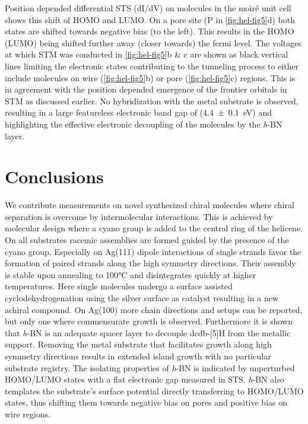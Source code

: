 Position depended differential STS (dI/dV) on molecules in the moir\'e unit cell shows this shift of HOMO and LUMO. On a pore site (P in \autoref{fig:hel-fig5}d) both states are shifted towards negative bias (to the left). This results in the HOMO (LUMO) being shifted further away (closer towards) the fermi level. The voltages at which STM was conducted in \autoref{fig:hel-fig5}b \& c are shown as black vertical lines limiting the electronic states contributing to the tunneling process to either include molecules on wire (\autoref{fig:hel-fig5}b) or pore (\autoref{fig:hel-fig5}c) regions. This is in agreement with the position depended emergence of the frontier orbitals in STM as discussed earlier. No hybridization with the metal substrate is observed, resulting in a large featureless electronic band gap of (\SI{4.4 \pm 0.1}{\eV}) and highlighting the effective electronic decoupling of the molecules by the \textit{h}-BN layer.


\section{Conclusions}

We contribute measurements on novel synthesized chiral molecules where chiral separation is overcome by intermolecular interactions. This is achieved by molecular design where a cyano group is added to the central ring of the helicene. On all substrates racemic assemblies are formed guided by the presence of the cyano group. Especially on Ag(111) dipole interactions of single strands favor the formation of paired strands along the high symmetry directions. Their assembly is stable upon annealing to 100°C and disintegrates quickly at higher temperatures. Here single molecules undergo a surface assisted cyclodehydrogenation using the silver surface as catalyst resulting in a new achiral compound. On Ag(100) more chain directions and setups can be reported, but only one where commensurate growth is observed. Furthermore it is shown that \textit{h}-BN is an adequate spacer layer to decouple dcdb-[5]H from the metallic support. Removing the metal substrate that facilitates growth along high symmetry directions results in extended island growth with no particular substrate registry. The isolating properties of \textit{h}-BN is indicated by unperturbed HOMO/LUMO states with a flat electronic gap measured in STS. \textit{h}-BN also templates the substrate’s surface potential directly transferring to HOMO/LUMO states, thus shifting them towards negative bias on pores and positive bias on wire regions. 
